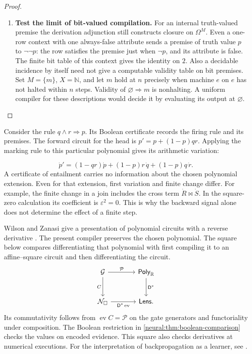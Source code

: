\documentclass[11pt,a4paper]{article}
\theoremstyle{definition}
\theoremstyle{remark}\newaliascnt{remark}{theorem}
\newcommand{\N}{\mathbb N}
\newcommand{\R}{\mathbb R}
\newcommand{\ev}{\operatorname{ev}}
\newcommand{\lens}{\mathsf{Lens}}
\newcommand{\NN}{\mathcal N}
\numberwithin{equation}{section}
\begin{document}
\begin{proof}
\begin{enumerate}[titledsteps]
    \item \textbf{Test the limit of bit-valued compilation.} For an internal truth-valued premise the derivation adjunction still constructs closure on $\Omega^M$. Even a one-row context with one always-false attribute sends a premise of truth value $p$ to $\neg\neg p$: the row satisfies the premise just when $\neg p$, and its attribute is false. The finite bit table of this context gives the identity on $2$. Also a decidable incidence by itself need not give a computable validity table on bit premises. Set $M=\{m\}$, $X=\N$, and let $m$ hold at $n$ precisely when machine $e$ on $e$ has not halted within $n$ steps. Validity of $\varnothing\Rightarrow m$ is nonhalting. A uniform compiler for these descriptions would decide it by evaluating its output at $\varnothing$.\qedhere
\end{enumerate}
\end{proof}

Consider the rule $q\wedge r\Rightarrow p$. Its Boolean certificate records the firing rule and its premises. The forward circuit for the head is $p'=p+(1-p)qr$. Applying the marking rule to this particular polynomial gives its arithmetic variation:


\[
 \dot p'=(1-qr)\dot p+(1-p)r\,\dot q+(1-p)q\,\dot r.
\]
A certificate of entailment carries no information about the chosen polynomial extension. Even for that extension, first variation and finite change differ. For example, the finite change in a join includes the cross term $\dot R\Join\dot S$. In the square-zero calculation its coefficient is $\varepsilon^2=0$. This is why the backward signal alone does not determine the effect of a finite step.

Wilson and Zanasi give a presentation of polynomial circuits with a reverse derivative \cite{wz}. The present compiler preserves the chosen polynomial. The square below compares differentiating that polynomial with first compiling it to an affine--square circuit and then differentiating the circuit.
\[
\begin{tikzcd}[column sep=large,row sep=large]
\mathcal G
 \arrow[r,"\mathcal P"] \arrow[d,"C"']
 & \mathsf{Poly}_{\R}
 \arrow[d,"\mathsf D^*"]\\
\NN_\square
 \arrow[r,"\mathsf D^*\ev"']
 & \lens.
\end{tikzcd}
\]
Its commutativity follows from $\ev C=\mathcal P$ on the gate generators and functoriality under composition. The Boolean restriction in \cref{neural:thm:boolean-comparison} checks the values on encoded evidence. This square also checks derivatives at numerical executions. For the interpretation of backpropagation as a learner, see \cite{neural:fong}.
\end{document}

